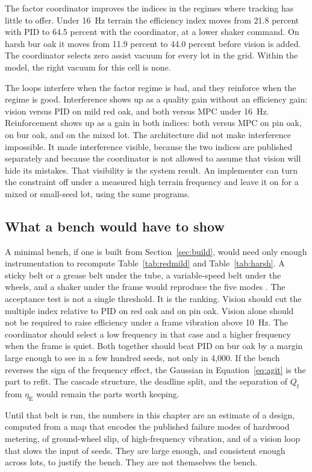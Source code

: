 The factor coordinator improves the indices in the regimes where tracking has little to offer. Under 16~Hz terrain the efficiency index moves from 21.8 percent with PID to 64.5 percent with the coordinator, at a lower shaker command. On harsh bur oak it moves from 11.9 percent to 44.0 percent before vision is added. The coordinator selects zero assist vacuum for every lot in the grid. Within the model, the right vacuum for this cell is none.

The loops interfere when the factor regime is bad, and they reinforce when the regime is good. Interference shows up as a quality gain without an efficiency gain: vision versus PID on mild red oak, and both versus MPC under 16~Hz. Reinforcement shows up as a gain in both indices: both versus MPC on pin oak, on bur oak, and on the mixed lot. The architecture did not make interference impossible. It made interference visible, because the two indices are published separately and because the coordinator is not allowed to assume that vision will hide its mistakes. That visibility is the system result. An implementer can turn the constraint off under a measured high terrain frequency and leave it on for a mixed or small-seed lot, using the same programs.

\subsection{What a bench would have to show}

A minimal bench, if one is built from Section~\ref{sec:build}, would need only enough instrumentation to recompute Table~\ref{tab:redmild} and Table~\ref{tab:harsh}. A sticky belt or a grease belt under the tube, a variable-speed belt under the wheels, and a shaker under the frame would reproduce the five modes \cite{panning2000,onal2009}. The acceptance test is not a single threshold. It is the ranking. Vision should cut the multiple index relative to PID on red oak and on pin oak. Vision alone should not be required to raise efficiency under a frame vibration above 10~Hz. The coordinator should select a low frequency in that case and a higher frequency when the frame is quiet. Both together should beat PID on bur oak by a margin large enough to see in a few hundred seeds, not only in 4{,}000. If the bench reverses the sign of the frequency effect, the Gaussian in Equation~\eqref{eq:agit} is the part to refit. The cascade structure, the deadline split, and the separation of $Q_{\mathrm{f}}$ from $\eta_{\mathrm{E}}$ would remain the parts worth keeping.

Until that belt is run, the numbers in this chapter are an estimate of a design, computed from a map that encodes the published failure modes of hardwood metering, of ground-wheel slip, of high-frequency vibration, and of a vision loop that slows the input of seeds. They are large enough, and consistent enough across lots, to justify the bench. They are not themselves the bench.


